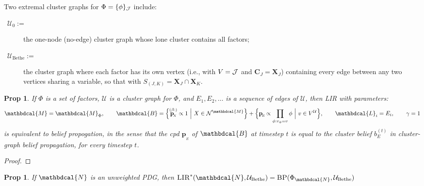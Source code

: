 \documentclass{article}
\theoremstyle{plain}
\newtheorem{prop}[theorem]{Prop}
\theoremstyle{definition}
\theoremstyle{remark}
\newcommand\mat[1]{\mathbf{#1}}
\newcommand{\bp}[1][L]{\mat{p}_{\!_{#1}\!}}
\newcommand{\N}{\mathcal N}
\newcommand{\dg}[1]{\mathbdcal{#1}}
\newcommand{\bundle}{\mathbin{+}}
\newcommand{\PDGof}[1]{{\dg M}_{#1}}
\newcommand{\FGof}[1]{\Phi_{{#1}}}
\begin{document}
Two extremal cluster graphs for $\Phi = \{\phi\}_{\cal J}$ include:
\begin{description}
	\item[{~$\mathcal U_0 :=$}] the one-node (no-edge) cluster graph  whose lone cluster contains all factors;
	\item[{~$\mathcal U_{\mathrm{Bethe}} :=$~}] the cluster graph where each factor has its own vertex (i.e., with $V = \cal J$ and $\mat C_J = \mat X_J$) containing every edge between any two vertices sharing a variable, so that with $S_{(J,K)} = \mat X_J \cap \mat X_K$.
\end{description}


\begin{defn}
\end{defn}

\clearpage
\begin{prop}
	If $\Phi$ is a set of factors, $\mathcal U$ is a cluster graph for $\Phi$, and $E_1, E_2, \ldots$ is a sequence of edges of $\mathcal U$, then LIR with parameters:
	\begin{equation*}
		\dg M = \PDGof{\Phi},
		\qquad \dg B = \Big\{ \overset{(\beta :  )}{\bp[X]} \propto 1 ~\Big|~ X \in \N^{\dg M} \Big\} \bundle
			\Big\{ \bp[E] \propto \prod_{\phi : v_\phi = v} \phi  ~\Big|~ v \in V^{\mathcal U} \Big\},
		\qquad \dg L_i = E_i,
		\qquad \gamma = 1
	\end{equation*}
	is equivalent to belief propogation, in the sense that the cpd $\bp[E]$ of $\dg B$ at timestep $t$ is equal to the cluster belief $b^{(t)}_{E}$ in cluster-graph belief propagation, for every timestep $t$.
\end{prop}
\begin{proof}

\end{proof}


\begin{prop}
	If $\dg N$ is an unweighted PDG, then
	$
		\textsc{LIR}^*(\dg N, \mathcal U_{\mathrm{Bethe}})
			 = \textsc{BP}( \FGof{\dg N}, \mathcal U_{\mathrm{Bethe}} )
	$
\end{prop}
\end{document}
